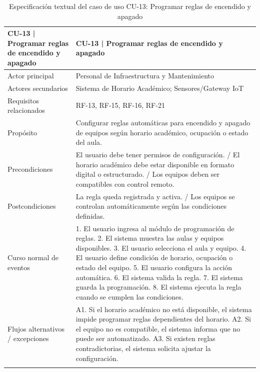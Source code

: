 \begingroup
\small
\begin{longtable}{|p{7.8cm}|p{7.8cm}|}
\hline
CU-13 | Programar reglas de encendido y apagado & CU-13 | Programar reglas de encendido y apagado \\ \hline
Actor principal & Personal de Infraestructura y Mantenimiento \\ \hline
Actores secundarios & Sistema de Horario Académico; Sensores/Gateway IoT \\ \hline
Requisitos relacionados & RF-13, RF-15, RF-16, RF-21 \\ \hline
Propósito & Configurar reglas automáticas para encendido y apagado de equipos según horario académico, ocupación o estado del aula. \\ \hline
Precondiciones & El usuario debe tener permisos de configuración. / El horario académico debe estar disponible en formato digital o estructurado. / Los equipos deben ser compatibles con control remoto. \\ \hline
Postcondiciones & La regla queda registrada y activa. / Los equipos se controlan automáticamente según las condiciones definidas. \\ \hline
Curso normal de eventos & 1. El usuario ingresa al módulo de programación de reglas. 2. El sistema muestra las aulas y equipos disponibles. 3. El usuario selecciona el aula y equipo. 4. El usuario define condición de horario, ocupación o estado del equipo. 5. El usuario configura la acción automática. 6. El sistema valida la regla. 7. El sistema guarda la programación. 8. El sistema ejecuta la regla cuando se cumplen las condiciones. \\ \hline
Flujos alternativos / excepciones & A1. Si el horario académico no está disponible, el sistema impide programar reglas dependientes del horario. A2. Si el equipo no es compatible, el sistema informa que no puede ser automatizado. A3. Si existen reglas contradictorias, el sistema solicita ajustar la configuración. \\ \hline
\caption{Especificación textual del caso de uso CU-13: Programar reglas de encendido y apagado}
\end{longtable}
\endgroup

